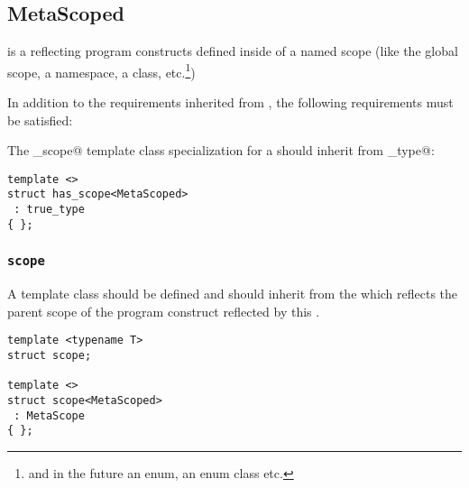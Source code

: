 \subsection{MetaScoped}
\label{concept-MetaScoped}

 is a  reflecting program constructs defined inside
of a named scope (like the global scope, a namespace, a class, etc.\footnote{
and in the future an enum, an enum class etc.})

In addition to the requirements inherited from , the following requirements must
be satisfied:

The \verb@has_scope@ template class specialization for a  should
inherit from \verb@true_type@:

\begin{verbatim}
template <>
struct has_scope<MetaScoped>
 : true_type
{ };
\end{verbatim}

\subsubsection{\texttt{scope}}

A template class \verb@scope@ should be defined and should inherit from the
 which reflects the parent scope of the program construct reflected
by this .

\begin{verbatim}
template <typename T>
struct scope;

template <>
struct scope<MetaScoped>
 : MetaScope
{ };
\end{verbatim}

